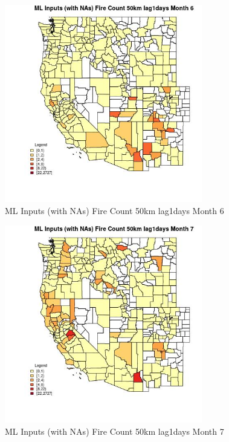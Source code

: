 \begin{figure} 
\centering  
\includegraphics[width=0.77\textwidth]{Code_Outputs/Report_ML_input_PM25_Step4_part_f_de_duplicated_aveswNAs_CountyFire_Count_50km_lag1daysmedianMonth6.jpg} 
\caption{\label{fig:Report_ML_input_PM25_Step4_part_f_de_duplicated_aveswNAsCountyFire_Count_50km_lag1daysmedianMonth6}ML Inputs (with NAs) Fire Count 50km lag1days Month 6} 
\end{figure} 
 

\begin{figure} 
\centering  
\includegraphics[width=0.77\textwidth]{Code_Outputs/Report_ML_input_PM25_Step4_part_f_de_duplicated_aveswNAs_CountyFire_Count_50km_lag1daysmedianMonth7.jpg} 
\caption{\label{fig:Report_ML_input_PM25_Step4_part_f_de_duplicated_aveswNAsCountyFire_Count_50km_lag1daysmedianMonth7}ML Inputs (with NAs) Fire Count 50km lag1days Month 7} 
\end{figure} 
 

